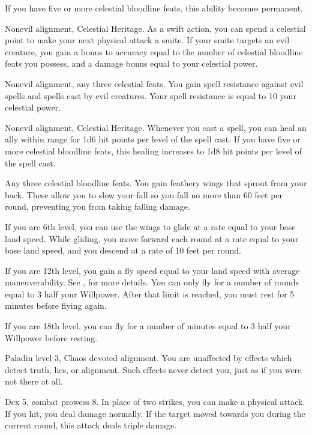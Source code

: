 If you have five or more celestial bloodline feats, this ability becomes permanent.

\featpres Nonevil alignment, Celestial Heritage.
\featben As a swift action, you can spend a celestial point to make your next physical attack a smite.
If your smite targets an evil creature, you gain a bonus to accuracy equal to the number of celestial bloodline feats you possess, and a damage bonus equal to your celestial power.

\featpres Nonevil alignment, any three celestial feats.
\featben You gain spell resistance against evil spells and spells cast by evil creatures.
Your spell resistance is equal to 10 \add your celestial power.

\featpres Nonevil alignment, Celestial Heritage.
\featben Whenever you cast a spell, you can heal an ally within \rngclose range for 1d6 hit points per level of the spell cast.
If you have five or more celestial bloodline feats, this healing increases to 1d8 hit points per level of the spell cast.

\featpre Any three celestial bloodline feats.
\featben You gain feathery wings that sprout from your back.
These allow you to slow your fall so you fall no more than 60 feet per round, preventing you from taking falling damage.

If you are 6th level, you can use the wings to glide at a rate equal to your base land speed.
While gliding, you move forward each round at a rate equal to your base land speed, and you descend at a rate of 10 feet per round.

If you are 12th level, you gain a fly speed equal to your land speed with average maneuverability.
See , for more details.
You can only fly for a number of rounds equal to 3 \add half your Willpower.
After that limit is reached, you must rest for 5 minutes before flying again.

If you are 18th level, you can fly for a number of minutes equal to 3 \add half your Willpower before resting.

\featpres Paladin level 3, Chaos devoted alignment.
\featben You are unaffected by effects which detect truth, lies, or alignment.
Such effects never detect you, just as if you were not there at all.

\featpres Dex 5, combat prowess 8.
\featben In place of two strikes, you can make a physical attack.
If you hit, you deal damage normally.
If the target moved towards you during the current round, this attack deals triple damage.

